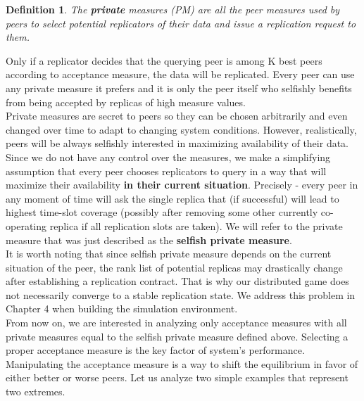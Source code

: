 \documentclass{pracamgren}
\newcounter{collective_ctr} \numberwithin{collective_ctr}{chapter}
\newtheorem{definition}[collective_ctr]{Definition}
\begin{document}
\begin{definition}
The {\bf private} measures (PM) are all the peer measures used by peers to select potential replicators of their data and issue a replication request to them.
\end{definition}

Only if a replicator decides that the querying peer is among K best peers according to acceptance measure, the data will be replicated. Every peer can use any private measure it prefers and it is only the peer itself who selfishly benefits from being accepted by replicas of high measure values.\\

Private measures are secret to peers so they can be chosen arbitrarily and even changed over time to adapt to changing system conditions. However, realistically, peers will be always selfishly interested in maximizing availability of their data. Since we do not have any control over the measures, we make a simplifying assumption that every peer chooses replicators to query in a way that will maximize their availability {\bf in their current situation}. Precisely - every peer in any moment of time will ask the single replica that (if successful) will lead to highest time-slot coverage (possibly after removing some other currently co-operating replica if all replication slots are taken). We will refer to the private measure that was just described as the {\bf selfish private measure}.\\

It is worth noting that since selfish private measure depends on the current situation of the peer, the rank list of potential replicas may drastically change after establishing a replication contract. That is why our distributed game does not necessarily converge to a stable replication state. We address this problem in Chapter 4 when building the simulation environment.\\

From now on, we are interested in analyzing only acceptance measures with all private measures equal to the selfish private measure defined above. Selecting a proper acceptance measure is the key factor of system's performance. Manipulating the acceptance measure is a way to shift the equilibrium in favor of either better or worse peers. Let us analyze two simple examples that represent two extremes.\\

\end{document}
